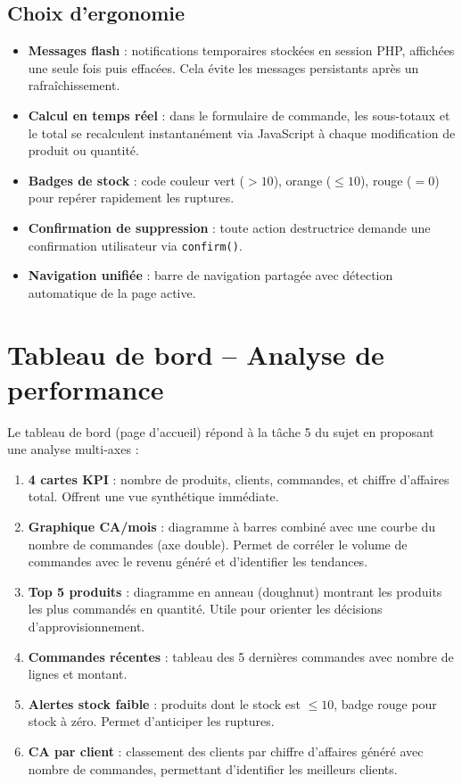 \documentclass[11pt,a4paper]{article}
\begin{document}
\subsection{Choix d'ergonomie}

\begin{itemize}
  \item \textbf{Messages flash} : notifications temporaires stock\'ees en session PHP, affich\'ees une seule fois puis effac\'ees. Cela \'evite les messages persistants apr\`es un rafra\^ichissement.
  \item \textbf{Calcul en temps r\'eel} : dans le formulaire de commande, les sous-totaux et le total se recalculent instantan\'ement via JavaScript \`a chaque modification de produit ou quantit\'e.
  \item \textbf{Badges de stock} : code couleur vert ($> 10$), orange ($\leq 10$), rouge ($= 0$) pour rep\'erer rapidement les ruptures.
  \item \textbf{Confirmation de suppression} : toute action destructrice demande une confirmation utilisateur via \texttt{confirm()}.
  \item \textbf{Navigation unifi\'ee} : barre de navigation partag\'ee avec d\'etection automatique de la page active.
\end{itemize}


\section{Tableau de bord -- Analyse de performance}

Le tableau de bord (page d'accueil) r\'epond \`a la t\^ache 5 du sujet en proposant une analyse multi-axes :

\begin{enumerate}
  \item \textbf{4 cartes KPI} : nombre de produits, clients, commandes, et chiffre d'affaires total. Offrent une vue synth\'etique imm\'ediate.
  \item \textbf{Graphique CA/mois} : diagramme \`a barres combin\'e avec une courbe du nombre de commandes (axe double). Permet de corr\'eler le volume de commandes avec le revenu g\'en\'er\'e et d'identifier les tendances.
  \item \textbf{Top 5 produits} : diagramme en anneau (doughnut) montrant les produits les plus command\'es en quantit\'e. Utile pour orienter les d\'ecisions d'approvisionnement.
  \item \textbf{Commandes r\'ecentes} : tableau des 5 derni\`eres commandes avec nombre de lignes et montant.
  \item \textbf{Alertes stock faible} : produits dont le stock est $\leq 10$, badge rouge pour stock \`a z\'ero. Permet d'anticiper les ruptures.
  \item \textbf{CA par client} : classement des clients par chiffre d'affaires g\'en\'er\'e avec nombre de commandes, permettant d'identifier les meilleurs clients.
\end{enumerate}
\end{document}
